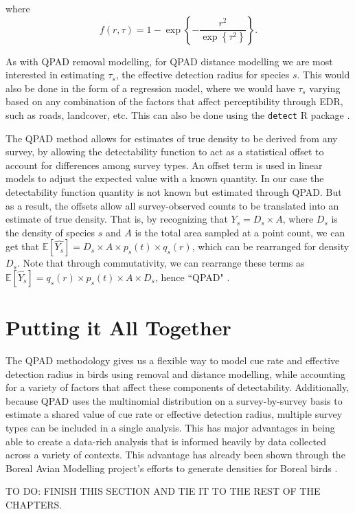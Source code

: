 where 
$$f(r,\tau) =  1 - \exp\left\{ -\dfrac{r^2}{\exp\left\{\tau^2\right\}} \right\}.$$

\par As with QPAD removal modelling, for QPAD distance modelling we are most interested in estimating $\tau_s$, the effective detection radius for species $s$. 
This would also be done in the form of a regression model, where we would have $\tau_s$ varying based on any combination of the factors that affect perceptibility through EDR, such as roads, landcover, etc.
This can also be done using the \texttt{detect} R package \citep{solymos_detect_2020}.

\par The QPAD method allows for estimates of true density to be derived from any survey, by allowing the detectability function to act as a statistical offset to account for differences among survey types. An offset term is used in linear models to adjust the expected value with a known quantity. In our case the detectability function quantity is not known but estimated through QPAD. But as a result, the offsets allow all survey-observed counts to be translated into an estimate of true density. That is, by recognizing that $Y_s = D_s \times A$, where $D_s$ is the density of species $s$ and $A$ is the total area sampled at a point count, we can get that $\mathbb{E}\left[\hat{Y_s}\right] = D_s \times A \times p_s(t) \times q_s(r)$, which can be rearranged for density $D_s$. Note that through commutativity, we can rearrange these terms as $\mathbb{E}\left[\hat{Y_s}\right] = q_s(r) \times p_s(t) \times A \times D_s$, hence ``QPAD" \citep{solymos_calibrating_2013}.

\section{Putting it All Together}
\par The QPAD methodology gives us a flexible way to model cue rate and effective detection radius in birds using removal and distance modelling, while accounting for a variety of factors that affect these components of detectability.
Additionally, because QPAD uses the multinomial distribution on a survey-by-survey basis to estimate a shared value of cue rate or effective detection radius, multiple survey types can be included in a single analysis.
This has major advantages in being able to create a data-rich analysis that is informed heavily by data collected across a variety of contexts.
This advantage has already been shown through the Boreal Avian Modelling project's efforts to generate densities for Boreal birds \citep{solymos_calibrating_2013, solymos_evaluating_2018, solymos_phylogeny_2018, solymos_lessons_2020}.

TO DO: FINISH THIS SECTION AND TIE IT TO THE REST OF THE CHAPTERS.



